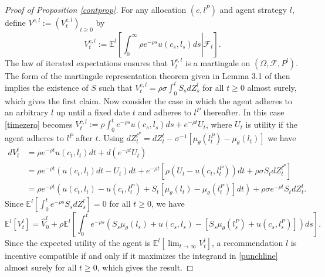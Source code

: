 \documentclass[11pt]{article}
\theoremstyle{plain}
\begin{document}
\begin{proof}[Proof of Proposition \ref{contprop}]
For any allocation $(c,l^P)$ and agent strategy $l$, define $V^{c,l} := (V^{c,l}_t)_{t\geq0}$ by
\begin{equation}
V_t^{c,l} := \mathbb{E}^l{\left[\left. \int_{0}^{\infty}\rho e^{-\rho s}u(c_s,l_s) ds \right| \mathcal{F}_t\right]}.
\label{timezero}
\end{equation} %
The law of iterated expectations ensures that $V_t^{c,l}$ is a martingale on $(\Omega, \mathcal{F}, P^l)$. The form of the martingale representation theorem given in Lemma 3.1 of \cite{cvitanic_optimal_2009} then implies the existence of $S$ such that $V_t^{c,l} = \rho \sigma \int_{0}^{t} S_sdZ^l_s$ for all $t \geq 0$ almost surely, which gives the first claim. Now consider the case in which the agent adheres to an arbitrary $l$ up until a fixed date $t$ and adheres to $l^P$ thereafter. In this case \eqref{timezero} becomes $V^{c,l}_t := \rho \int_{0}^{t} e^{-\rho s} u(c_s,l_s)ds + e^{-\rho t} U_t$, where $U_t$ is utility if the agent adheres to $l^P$ after $t$. Using $dZ^{l^P}_t = dZ^l_t - \sigma^{-1}[\mu_{\theta}(l^P_{t}) - \mu_{\theta}(l_{t})]$ we have %
\begin{align*}
dV^l_t & = \rho e^{-\rho t} u(c_t,l_t)dt +  d{\left(e^{-\rho t} U_t\right)}
\\ & = \rho e^{-\rho t} (u(c_t,l_t)dt - U_t)dt + e^{-\rho t} {\left[ \rho(U_t - u(c_t, l_t^P))dt +  \rho\sigma S_tdZ^{l^P}_t\right]}
\\ & = \rho e^{-\rho t}{\left(u(c_t,l_t) - u(c_t, l_t^P) + S_t [\mu_{\theta}(l_t)-\mu_{\theta}(l^P_t)] dt\right)} + \rho \sigma e^{-\rho t} S_tdZ^l_t. %
\end{align*}
Since $\mathbb{E}^l{\left[ \int_{0}^{t} e^{-\rho s} S_sdZ^l_s \right]} = 0$ for all $t \geq 0$, we have 
\begin{equation}
\mathbb{E}^l[V^l_t] = \hat{V}^l_0 + \rho \mathbb{E}^l{\left[\int_{0}^{t}e^{-\rho s} {\left(S_s\mu_{\theta}(l_s) + u(c_s, l_s) - [S_s\mu_{\theta}(l^P_s) + u(c_s, l^P_s)]\right)}ds \right]}.
\label{punchline}
\end{equation}
Since the expected utility of the agent is $\mathbb{E}^l[ \lim_{t \rightarrow \infty} V^l_t]$, a recommendation $l$ is incentive compatible if and only if it maximizes the integrand in \eqref{punchline} almost surely for all $t \geq 0$, which gives the result. 
\end{proof}
\end{document}
